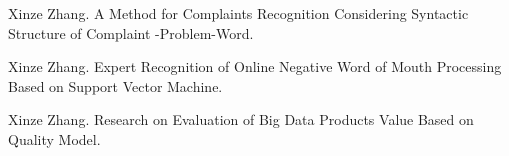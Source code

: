 
\begin{cventries}
\vspace{-1.5mm}
\cvpapers
{
    \begin{cvitems}
    \item {Xinze Zhang. A Method for Complaints Recognition Considering Syntactic Structure of Complaint -Problem-Word.}
    \item {Xinze Zhang. Expert Recognition of Online Negative Word of Mouth Processing Based on Support Vector Machine.}
    \item {Xinze Zhang. Research on Evaluation of Big Data Products Value Based on Quality Model.}
    \end{cvitems}
}

\end{cventries}